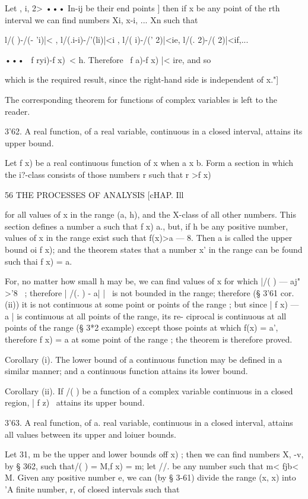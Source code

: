 Let  ,  i,  2> ••• In-ij   be their end points ] then if x be any point of the rth interval 
we can find numbers Xi, x-i, ... Xn such that 

l/( )-/(- 'i)|< , l/(.i-i)-/'(li)|<i , l/( i)-/(' 2)|<ie, l/(. 2)-/( 2)|<if,... 

••• \ f  ryi)-f x)\ < h. 
Therefore \ f a)-f x) |< ire, and so 

which is the required result, since the right-hand side is independent of x."] 

The corresponding theorem for functions of complex variables is left to the reader. 

3'62. A real function, of a real variable, continuous in a closed interval, 
attains its upper bound. 

Let f x) be a real continuous function of x when a x b. Form a 
section in which the i?-class consists of those numbers r such that r >f x) 



56 THE PROCESSES OF ANALYSIS [cHAP. Ill 

for all values of x in the range (a, h), and the X-class of all other numbers. 
This section defines a number a such that f x) a., but, if h be any positive 
number, values of x in the range exist such that f(x)>a — 8. Then a is 
called the upper bound oi f x); and the theorem states that a number x' 
in the range can be found such thai f x) = a. 

For, no matter how small h may be, we can find values of x for which 
|/( ) — aj"  >'8~ ; therefore |  /(. ) - a| |~  is not bounded in the range; 
therefore (§ 3'61 cor. (ii)) it is not continuous at some point or points of the 
range ; but since | f x) — a | is continuous at all points of the range, its re- 
ciprocal is continuous at all points of the range (§ 3*2 example) except 
those points at which f(x) = a', therefore f x) = a at some point of the 
range ; the theorem is therefore proved. 

Corollary (i). The lower bound of a continuous function may be defined 
in a similar manner; and a continuous function attains its lower bound. 

Corollary (ii). If /( ) be a function of a complex variable continuous in 
a closed region, | f z) \ attains its upper bound. 

3'63. A real function, of a. real variable, continuous in a closed interval, 
attains all values between its upper and loiuer bounds. 

Let 31, m be the upper and lower bounds off x) ; then we can find numbers 
X, -v, by § 362, such that/( ) = M,f x) = m; let //. be any number such that 
m< fjb< M. Given any positive number e, we can (by § 3-61) divide the range 
(x, x) into 'A finite number, r, of closed intervals such that 

